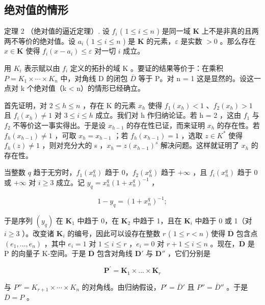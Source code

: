 \subsection{绝对值的情形}

定理 2 （绝对值的逼近定理）. 设 \(f_{i}\) ( \(1 \leqslant i \leqslant n\) ) 是同一域 \(\mathbf{K}\) 上不是非真的且两两不等价的绝对值。设 \(a_{i}\) ( \(1 \leqslant i \leqslant n\) ) 是 \(\mathbf{K}\) 的元素，\(\varepsilon\) 是实数 \(>0\) 。那么存在 \(x \in \mathbf{K}\) 使得 \(f_{i}(x - a_{i}) \leqslant \varepsilon\) 对一切 \(i\) 成立。

用 \(K_{i}\) 表示赋以由 \(f_{i}\) 定义的拓扑的域 K 。要证的结果等价于：在乘积 \(P = K_{1} \times \cdots \times K_{n}\) 中，对角线 D 的闭包 \(\overline{D}\) 等于 P。对 n = 1 这是显然的。设这一点对 k 个绝对值（k < n）的情形已经确立。

首先证明，对 \(2 \leqslant h \leqslant n\) ，存在 K 的元素 \(x_{h}\) 使得 \(f_{1}(x_{h}) < 1\) 、\(f_{2}(x_{h}) > 1\) 且 \(f_{i}(x_{h}) \neq 1\) 对 \(3 \leqslant i \leqslant h\) 成立。我们对 h 作归纳论证。若 h = 2 ，这由 \(f_{1}\) 与 \(f_{2}\) 不等价这一事实得出。于是设 \(x_{h-1}\) 的存在性已证，而来证明 \(x_{h}\) 的存在性。若 \(f_{h}(x_{h-1}) \neq 1\) ，可取 \(x_{h} = x_{h-1}\) ；若 \(f_{h}(x_{h-1}) = 1\) ，选取 \(z \in K^{*}\) 使得 \(f_{h}(z) \neq 1\) ，则对充分大的 s ，\(x_{h} = z(x_{h-1})^{s}\) 解决问题。这样就证明了 \(x_{h}\) 的存在性。

当整数 \(q\) 趋于无穷时，\(f_{1}(x_{n}^{q})\) 趋于 0，\(f_{2}(x_{n}^{q})\) 趋于 \(+\infty\) ，且 \(f_{i}(x_{n}^{q})\) 趋于 0 或 \(+\infty\) 对 \(i \geqslant 3\) 成立。记 \(y_{q} = x_{n}^{q}(1 + x_{n}^{q})^{-1}\) ，

\[
1 - y _ {q} = (1 + x _ {n} ^ {q}) ^ {- 1};
\]

于是序列 \((y_q)\) 在 \(\mathbf{K}_1\) 中趋于 0，在 \(\mathbf{K}_2\) 中趋于 1，且在 \(\mathbf{K}_i\) 中趋于 0 或 1（对 \(i \geqslant 3\) ）。改变诸 \(\mathbf{K}_i\) 的编号，因此可以设存在整数 \(r\) ( \(1 \leqslant r < n\) ) 使得 \(\overline{\mathbf{D}}\) 包含点 \((e_1, \ldots, e_n)\) ，其中 \(e_i = 1\) 对 \(1 \leqslant i \leqslant r\) ，\(e_i = 0\) 对 \(r + 1 \leqslant i \leqslant n\) 。现在，\(\overline{\mathbf{D}}\) 是 P 的向量子 K-空间。于是 \(\overline{\mathbf{D}}\) 包含对角线 \(\mathbf{D}'\) 与 \(\mathbf{D}''\) ，它们分别是

\[
\mathbf {P} ^ {\prime} = \mathbf {K} _ {1} \times \dots \times \mathbf {K} _ {r}
\]

与 \(P'' = K_{r+1} \times \cdots \times K_n\) 的对角线。由归纳假设，\(P' = \overline{D}'\) 且 \(P'' = \overline{D}''\) 。于是 \(\overline{D} = P\) 。

